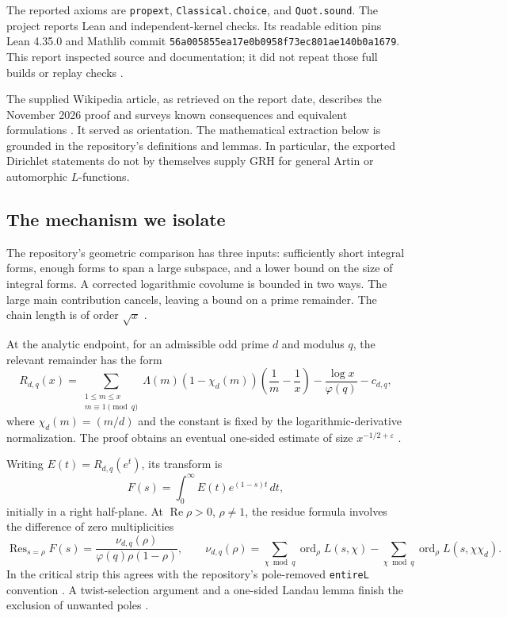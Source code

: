 \documentclass[11pt,a4paper]{article}
\theoremstyle{definition}\newtheorem{definition}[theorem]{Definition}
\theoremstyle{remark}\newtheorem{remark}[theorem]{Remark}
\newcommand{\Res}{\operatorname{Res}}
\newcommand{\Rea}{\operatorname{Re}}
\newcommand{\ord}{\operatorname{ord}}
\begin{document}
The reported axioms are \texttt{propext}, \texttt{Classical.choice}, and \texttt{Quot.sound}. The project reports Lean and independent-kernel checks. Its readable edition pins Lean 4.35.0 and Mathlib commit \nolinkurl{56a005855ea17e0b0958f73ec801ae140b0a1679}. This report inspected source and documentation; it did not repeat those full builds or replay checks \cite{readme}.

The supplied Wikipedia article, as retrieved on the report date, describes the November 2026 proof and surveys known consequences and equivalent formulations \cite{wiki}. It served as orientation. The mathematical extraction below is grounded in the repository's definitions and lemmas. In particular, the exported Dirichlet statements do not by themselves supply GRH for general Artin or automorphic $L$-functions.

\subsection{The mechanism we isolate}
The repository's geometric comparison has three inputs: sufficiently short integral forms, enough forms to span a large subspace, and a lower bound on the size of integral forms. A corrected logarithmic covolume is bounded in two ways. The large main contribution cancels, leaving a bound on a prime remainder. The chain length is of order $\sqrt{x}$ \cite{guide,mainineq}.

At the analytic endpoint, for an admissible odd prime $d$ and modulus $q$, the relevant remainder has the form
\begin{equation}\label{eq:prime-remainder}
R_{d,q}(x)=\sum_{\substack{1\le m\le x\\m\equiv1\pmod q}}
\Lambda(m)(1-\chi_d(m))\left(\frac1m-\frac1x\right)
-\frac{\log x}{\varphi(q)}-c_{d,q},
\end{equation}
where $\chi_d(m)=(m/d)$ and the constant is fixed by the logarithmic-derivative normalization. The proof obtains an eventual one-sided estimate of size $x^{-1/2+\varepsilon}$ \cite{onesided}.

Writing $E(t)=R_{d,q}(e^t)$, its transform is
\begin{equation}\label{eq:transform}
F(s)=\int_0^\infty E(t)e^{(1-s)t}\,dt,
\end{equation}
initially in a right half-plane. At $\Rea\rho>0$, $\rho\ne1$, the residue formula involves the difference of zero multiplicities
\begin{equation}\label{eq:arithmetic-residue}
\Res_{s=\rho}F(s)=\frac{\nu_{d,q}(\rho)}{\varphi(q)\rho(1-\rho)},\qquad
\nu_{d,q}(\rho)=\sum_{\chi\bmod q}\ord_\rho L(s,\chi)
-\sum_{\chi\bmod q}\ord_\rho L(s,\chi\chi_d).
\end{equation}
In the critical strip this agrees with the repository's pole-removed \texttt{entireL} convention \cite{primeerror}. A twist-selection argument and a one-sided Landau lemma finish the exclusion of unwanted poles \cite{criterion,landau}.
\end{document}
